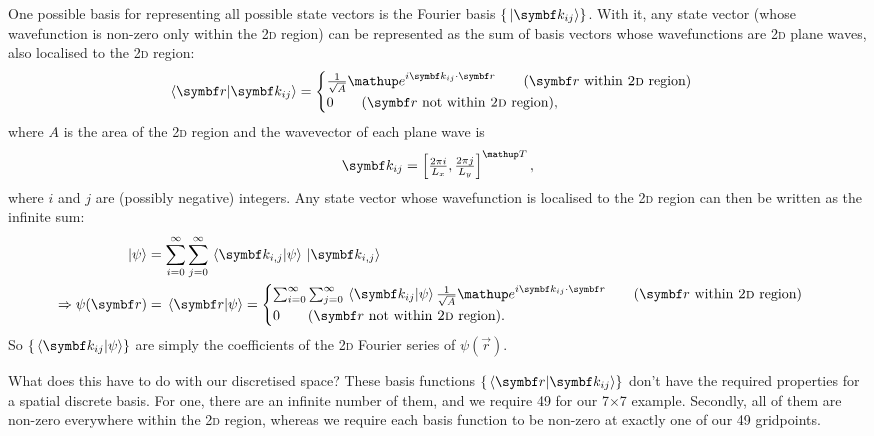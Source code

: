 One possible basis for representing all possible state vectors is the Fourier basis $\{\ket{\vec k_{ij}}\}$. With it, any state vector (whose wavefunction is non-zero only within the \textsc{2d} region) can be represented as the sum of basis vectors whose wavefunctions are \textsc{2d} plane waves, also localised to the 2\textsc{d} region:
\begin{align}\label{eq:spatial_plane_wave_basis}
\braket{\vec r}{\vec k_{ij}} = \begin{cases}
\frac 1 {\sqrt A} \ee^{i\vec k_{ij}\cdot\vec r}\qquad (\vec r\ \textrm{within \textsc{2d} region})\\
0\qquad(\vec r\ \textrm{not within \textsc{2d} region}),
\end{cases}
\end{align}
where $A$ is the area of the \textsc{2d} region and the wavevector of each plane wave is
\begin{align}
\vec k_{ij} = \left[ \tfrac {2\pi i}{L_x}, \tfrac {2\pi j}{L_y}\right]^\up{T},
\end{align}
where $i$ and $j$ are (possibly negative) integers. Any state vector whose wavefunction is localised to the \textsc{2d} region can then be written as the infinite sum:
\begin{align}
\ket\psi &= \sum_{i=0}^\infty\sum_{j=0}^\infty \braket{\vec k_{i,j}}\psi \ket{\vec k_{i,j}}\\
\Rightarrow \psi(\vec r) &= \braket{\vec r}{\psi} = \begin{cases}
\sum_{i=0}^\infty\sum_{j=0}^\infty \braket{\vec k_{ij}}\psi \frac 1 {\sqrt A} \ee^{i\vec k_{ij}\cdot\vec r}
\qquad (\vec r\ \textrm{within \textsc{2d} region})\\
0\qquad(\vec r\ \textrm{not within \textsc{2d} region}).
\end{cases}
\end{align}
So $\{\braket{\vec k_{ij}}\psi\}$ are simply the coefficients of the \textsc{2d} Fourier series of $\psi(\vec r)$.

What does this have to do with our discretised space? These basis functions $\{\braket{\vec r}{\vec k_{ij}}\}$ don't have the required properties for a spatial discrete basis. For one, there are an infinite number of them, and we require 49 for our 7$\times$7 example. Secondly, all of them are non-zero everywhere within the \textsc{2d} region, whereas we require each basis function to be non-zero at exactly one of our 49 gridpoints.

